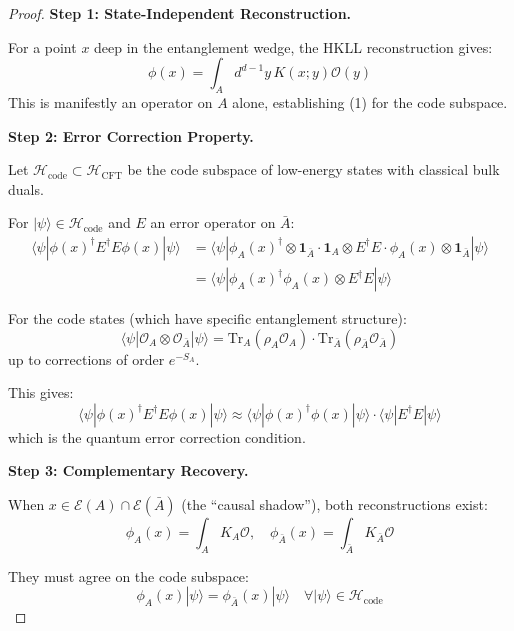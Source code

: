 \documentclass[12pt,a4paper]{article}
\begin{document}
\begin{proof}
\textbf{Step 1: State-Independent Reconstruction.}

For a point $x$ deep in the entanglement wedge, the HKLL reconstruction gives:
\begin{equation}
\phi(x) = \int_A d^{d-1}y \, K(x; y) \mathcal{O}(y)
\end{equation}
This is manifestly an operator on $A$ alone, establishing (1) for the code subspace.

\textbf{Step 2: Error Correction Property.}

Let $\mathcal{H}_{\text{code}} \subset \mathcal{H}_{\text{CFT}}$ be the code subspace of low-energy states with classical bulk duals.

For $|\psi\rangle \in \mathcal{H}_{\text{code}}$ and $E$ an error operator on $\bar{A}$:
\begin{align}
\langle\psi|\phi(x)^\dagger E^\dagger E \phi(x)|\psi\rangle &= \langle\psi|\phi_A(x)^\dagger \otimes \mathbf{1}_{\bar{A}} \cdot \mathbf{1}_A \otimes E^\dagger E \cdot \phi_A(x) \otimes \mathbf{1}_{\bar{A}}|\psi\rangle \\
&= \langle\psi|\phi_A(x)^\dagger \phi_A(x) \otimes E^\dagger E|\psi\rangle
\end{align}

For the code states (which have specific entanglement structure):
\begin{equation}
\langle\psi|\mathcal{O}_A \otimes \mathcal{O}_{\bar{A}}|\psi\rangle = \text{Tr}_A(\rho_A \mathcal{O}_A) \cdot \text{Tr}_{\bar{A}}(\rho_{\bar{A}} \mathcal{O}_{\bar{A}})
\end{equation}
up to corrections of order $e^{-S_A}$.

This gives:
\begin{equation}
\langle\psi|\phi(x)^\dagger E^\dagger E \phi(x)|\psi\rangle \approx \langle\psi|\phi(x)^\dagger\phi(x)|\psi\rangle \cdot \langle\psi|E^\dagger E|\psi\rangle
\end{equation}
which is the quantum error correction condition.

\textbf{Step 3: Complementary Recovery.}

When $x \in \mathcal{E}(A) \cap \mathcal{E}(\bar{A})$ (the ``causal shadow''), both reconstructions exist:
\begin{equation}
\phi_A(x) = \int_A K_A \mathcal{O}, \quad \phi_{\bar{A}}(x) = \int_{\bar{A}} K_{\bar{A}} \mathcal{O}
\end{equation}

They must agree on the code subspace:
\begin{equation}
\phi_A(x)|\psi\rangle = \phi_{\bar{A}}(x)|\psi\rangle \quad \forall |\psi\rangle \in \mathcal{H}_{\text{code}}
\end{equation}


\end{proof}
\end{document}
